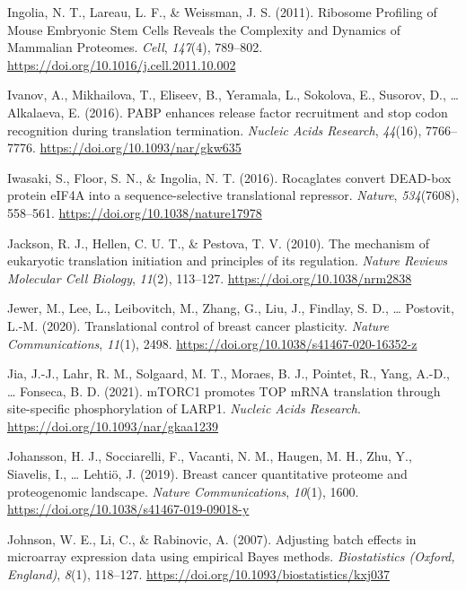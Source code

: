 \documentclass[12pt,openany]{book}
\begin{document}
\hypertarget{ref-Ingolia2011}{}
Ingolia, N. T., Lareau, L. F., \& Weissman, J. S. (2011). Ribosome
Profiling of Mouse Embryonic Stem Cells Reveals the Complexity and
Dynamics of Mammalian Proteomes. \emph{Cell}, \emph{147}(4), 789--802.
\url{https://doi.org/10.1016/j.cell.2011.10.002}

\hypertarget{ref-Ivanov2016}{}
Ivanov, A., Mikhailova, T., Eliseev, B., Yeramala, L., Sokolova, E.,
Susorov, D., \ldots{} Alkalaeva, E. (2016). PABP enhances release factor
recruitment and stop codon recognition during translation termination.
\emph{Nucleic Acids Research}, \emph{44}(16), 7766--7776.
\url{https://doi.org/10.1093/nar/gkw635}

\hypertarget{ref-Iwasaki2016}{}
Iwasaki, S., Floor, S. N., \& Ingolia, N. T. (2016). Rocaglates convert
DEAD-box protein eIF4A into a sequence-selective translational
repressor. \emph{Nature}, \emph{534}(7608), 558--561.
\url{https://doi.org/10.1038/nature17978}

\hypertarget{ref-Jackson2010}{}
Jackson, R. J., Hellen, C. U. T., \& Pestova, T. V. (2010). The
mechanism of eukaryotic translation initiation and principles of its
regulation. \emph{Nature Reviews Molecular Cell Biology}, \emph{11}(2),
113--127. \url{https://doi.org/10.1038/nrm2838}

\hypertarget{ref-Jewer2020}{}
Jewer, M., Lee, L., Leibovitch, M., Zhang, G., Liu, J., Findlay, S. D.,
\ldots{} Postovit, L.-M. (2020). Translational control of breast cancer
plasticity. \emph{Nature Communications}, \emph{11}(1), 2498.
\url{https://doi.org/10.1038/s41467-020-16352-z}

\hypertarget{ref-Jia2021}{}
Jia, J.-J., Lahr, R. M., Solgaard, M. T., Moraes, B. J., Pointet, R.,
Yang, A.-D., \ldots{} Fonseca, B. D. (2021). mTORC1 promotes TOP mRNA
translation through site-specific phosphorylation of LARP1.
\emph{Nucleic Acids Research}.
\url{https://doi.org/10.1093/nar/gkaa1239}

\hypertarget{ref-Johansson2019}{}
Johansson, H. J., Socciarelli, F., Vacanti, N. M., Haugen, M. H., Zhu,
Y., Siavelis, I., \ldots{} Lehtiö, J. (2019). Breast cancer quantitative
proteome and proteogenomic landscape. \emph{Nature Communications},
\emph{10}(1), 1600. \url{https://doi.org/10.1038/s41467-019-09018-y}

\hypertarget{ref-Johnson2007}{}
Johnson, W. E., Li, C., \& Rabinovic, A. (2007). Adjusting batch effects
in microarray expression data using empirical Bayes methods.
\emph{Biostatistics (Oxford, England)}, \emph{8}(1), 118--127.
\url{https://doi.org/10.1093/biostatistics/kxj037}
\end{document}
